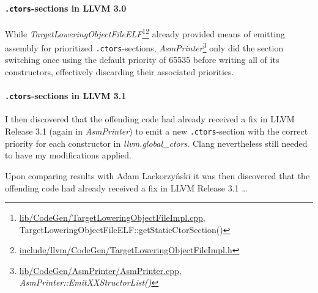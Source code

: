 
\paragraph{\texttt{.ctors}-sections in LLVM 3.0}

While
\emph{Target\-Lowering\-Object\-File\-ELF}\footnote{\url{lib/CodeGen/TargetLoweringObjectFileImpl.cpp},
TargetLoweringObjectFileELF::getStaticCtorSection()}\footnote{\url{include/llvm/CodeGen/TargetLoweringObjectFileImpl.h}}
already provided means of emitting assembly for prioritized
\texttt{.ctors}-sections,
\emph{Asm\-Printer}\footnote{\url{lib/CodeGen/AsmPrinter/AsmPrinter.cpp},
\emph{AsmPrinter::EmitXXStructorList()}} only did the section switching once
using the default priority of 65535 before writing all of its constructors,
effectively discarding their associated priorities.



\paragraph{\texttt{.ctors}-sections in LLVM 3.1}

I then discovered that the
offending code had already received
a fix in LLVM
Release 3.1 (again in \emph{AsmPrinter}) to emit a new \texttt{.ctors}-section
with the correct priority for each constructor
in \emph{llvm.global\_ctors}. Clang nevertheless still needed to have my
modifications applied.

\begin{leftbar}
  Upon comparing results with Adam Lackorzyński it was then discovered that the
  offending code had already received a fix in LLVM Release 3.1 …
\end{leftbar}

